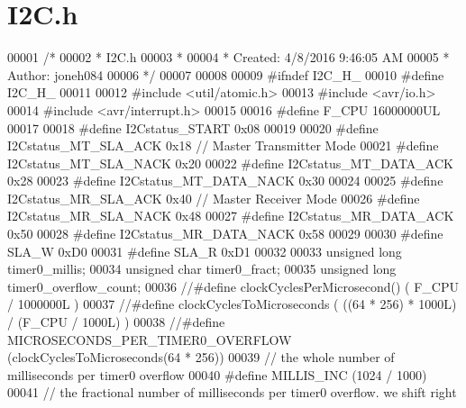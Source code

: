 \hypertarget{old_2_i2_c_8h_source}{}\section{I2\+C.\+h}
\label{old_2_i2_c_8h_source}

\begin{DoxyCode}
00001 \textcolor{comment}{/*}
00002 \textcolor{comment}{ * I2C.h}
00003 \textcolor{comment}{ *}
00004 \textcolor{comment}{ * Created: 4/8/2016 9:46:05 AM}
00005 \textcolor{comment}{ *  Author: joneh084}
00006 \textcolor{comment}{ */} 
00007 
00008 
00009 \textcolor{preprocessor}{#ifndef I2C\_H\_}
00010 \textcolor{preprocessor}{#define I2C\_H\_}
00011 
00012 \textcolor{preprocessor}{#include <util/atomic.h>}
00013 \textcolor{preprocessor}{#include <avr/io.h>}
00014 \textcolor{preprocessor}{#include <avr/interrupt.h>}
00015 
00016 \textcolor{preprocessor}{#define F\_CPU 16000000UL}
00017 
00018 \textcolor{preprocessor}{#define I2Cstatus\_START 0x08}
00019 
00020 \textcolor{preprocessor}{#define I2Cstatus\_MT\_SLA\_ACK 0x18       // Master Transmitter Mode}
00021 \textcolor{preprocessor}{#define I2Cstatus\_MT\_SLA\_NACK 0x20}
00022 \textcolor{preprocessor}{#define I2Cstatus\_MT\_DATA\_ACK 0x28}
00023 \textcolor{preprocessor}{#define I2Cstatus\_MT\_DATA\_NACK 0x30}
00024 
00025 \textcolor{preprocessor}{#define I2Cstatus\_MR\_SLA\_ACK 0x40       // Master Receiver Mode}
00026 \textcolor{preprocessor}{#define I2Cstatus\_MR\_SLA\_NACK 0x48}
00027 \textcolor{preprocessor}{#define I2Cstatus\_MR\_DATA\_ACK 0x50}
00028 \textcolor{preprocessor}{#define I2Cstatus\_MR\_DATA\_NACK 0x58}
00029 
00030 \textcolor{preprocessor}{#define SLA\_W 0xD0}
00031 \textcolor{preprocessor}{#define SLA\_R 0xD1}
00032 
00033 \textcolor{keywordtype}{unsigned} \textcolor{keywordtype}{long} timer0\_millis;
00034 \textcolor{keywordtype}{unsigned} \textcolor{keywordtype}{char} timer0\_fract;
00035 \textcolor{keywordtype}{unsigned} \textcolor{keywordtype}{long} timer0\_overflow\_count;
00036 \textcolor{comment}{//#define clockCyclesPerMicrosecond() ( F\_CPU / 1000000L )}
00037 \textcolor{comment}{//#define clockCyclesToMicroseconds ( ((64 * 256) * 1000L) / (F\_CPU / 1000L) )}
00038 \textcolor{comment}{//#define MICROSECONDS\_PER\_TIMER0\_OVERFLOW (clockCyclesToMicroseconds(64 * 256))}
00039 \textcolor{comment}{// the whole number of milliseconds per timer0 overflow}
00040 \textcolor{preprocessor}{#define MILLIS\_INC (1024 / 1000)}
00041 \textcolor{comment}{// the fractional number of milliseconds per timer0 overflow. we shift right}

\end{DoxyCode}
